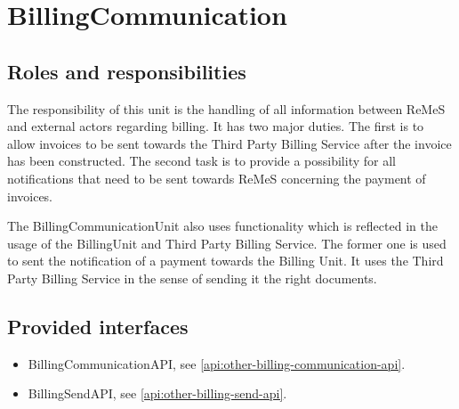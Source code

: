 \section{BillingCommunication}
\label{element:billing-communication}

\subsection{Roles and responsibilities}

\npar The responsibility of this unit is the handling of all information between
ReMeS and external actors regarding billing. It has two major duties. The first
is to allow invoices to be sent towards the Third Party Billing Service after
the invoice has been constructed. The second task is to provide a possibility
for all notifications that need to be sent towards ReMeS concerning the payment
of invoices.

\npar The BillingCommunicationUnit also uses functionality which is reflected
in the usage of the BillingUnit and Third Party Billing Service. The former one
is used to sent the notification of a payment towards the Billing Unit. It uses
the Third Party Billing Service in the sense of sending it the right documents.

\subsection{Provided interfaces}

\begin{itemize}
  \item BillingCommunicationAPI, see \ref{api:other-billing-communication-api}.
  \item BillingSendAPI, see \ref{api:other-billing-send-api}.
\end{itemize}